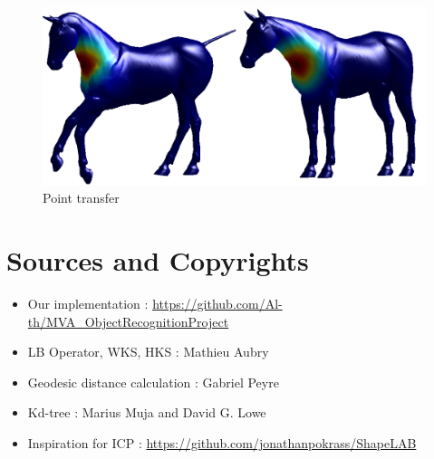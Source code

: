 \documentclass[10pt,twocolumn,letterpaper]{article}
\begin{document}
\begin{figure}[h]
\centering
\includegraphics[width=.3\textwidth]{Images/pointTransfer.png}
\caption{Point transfer}
\label{refinement}
\end{figure}




\section*{Sources and Copyrights}
\begin{itemize}
\setlength\itemsep{0.01em}
\item{Our implementation : \url{https://github.com/Al-th/MVA_ObjectRecognitionProject}}
\item{LB Operator, WKS, HKS : Mathieu Aubry}
\item{Geodesic distance calculation : Gabriel Peyre}
\item{Kd-tree : Marius Muja and David G. Lowe}
\item{Inspiration for ICP : \url{https://github.com/jonathanpokrass/ShapeLAB}}
\end{itemize}


{\small


}
\end{document}
